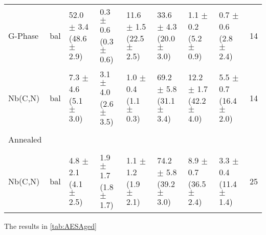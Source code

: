 \documentclass[review, 1p, number, sort&compress,table]{elsarticle}
\begin{document}
\begin{table*}[ht!]
\begin{tabular}{p{1.7cm}lllllllp{1cm}}
					G-Phase 					& bal & \parbox[t]{1.6cm}{52.0 $\pm$ 3.4 \\ (48.6 $\pm$ 2.9)} & \parbox[t]{1.6cm}{0.3 $\pm$ 0.6 \\ (0.3 $\pm$ 0.6)} 		& \parbox[t]{1.6cm}{11.6 $\pm$ 1.5 \\ (22.5 $\pm$ 2.5)}& \parbox[t]{1.6cm}{33.6 $\pm$ 4.3 \\ (20.0 $\pm$ 3.0)} & \parbox[t]{1.6cm}{1.1 $\pm$ 0.2 \\ (5.2 $\pm$ 0.9)} 			& \parbox[t]{1.6cm}{0.7 $\pm$ 0.6 \\ (2.8 $\pm$ 2.4)} 	 & 14  \\[7mm]
					Nb(C,N) 					& bal & \parbox[t]{1.6cm}{7.3 $\pm$ 4.6 \\ (5.1 $\pm$ 3.0)} & \parbox[t]{1.6cm}{3.1 $\pm$ 4.0 \\ (2.6 $\pm$ 3.5)} 		& \parbox[t]{1.6cm}{1.0 $\pm$ 0.4 \\ (1.1 $\pm$ 0.3)}& \parbox[t]{1.6cm}{69.2 $\pm$ 5.8 \\ (31.1 $\pm$ 3.4)} & \parbox[t]{1.6cm}{12.2 $\pm$ 1.7 \\ (42.2 $\pm$ 4.0)} 			& \parbox[t]{1.6cm}{5.5 $\pm$ 0.7 \\ (16.4 $\pm$ 2.0)} 	 & 14  \\
					\\\hline
					  Annealed  &&&&&&&& \\
					\hline\\
					Nb(C,N) 					& bal & \parbox[t]{1.6cm}{4.8 $\pm$ 2.1 \\ (4.1 $\pm$ 2.5)} & \parbox[t]{1.6cm}{1.9 $\pm$ 1.7 \\ (1.8 $\pm$ 1.7)} 		& \parbox[t]{1.6cm}{1.1 $\pm$ 1.2 \\ (1.9 $\pm$ 2.1)}& \parbox[t]{1.6cm}{74.2 $\pm$ 5.8 \\ (39.2 $\pm$ 3.0)} & \parbox[t]{1.6cm}{8.9 $\pm$ 0.7 \\ (36.5 $\pm$ 2.4)} 			& \parbox[t]{1.6cm}{3.3 $\pm$ 0.4 \\ (11.4 $\pm$ 1.4)} 	 & 25  \\\bottomrule
				\end{tabular}
			\label{tab:AESAged}
		\end{table*}
			
\indent The results in \autoref{tab:AESAged}   
	
\end{document}
